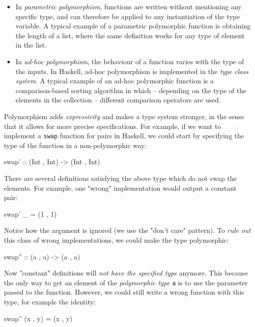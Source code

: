             \begin{itemize}
                \item In \emph{parametric polymorphism}, functions are written without mentioning any specific type,
                    and can therefore be applied to any instantiation of the type variable.
                    A typical example of a parametric polymorphic function is obtaining the length of a list,
                    where the same definition works for any type of element in the list.

                \item In \emph{ad-hoc polymorphism}, the behaviour of a function varies with the type of the inputs.
                    In Haskell, ad-hoc polymorphism is implemented in the \emph{type class system}.
                    A typical example of an ad-hoc polymorphic function is a comparison-based sorting algorithm
                    in which – depending on the type of the elements in the collection – different
                    comparison operators are used.
            \end{itemize}

            Polymorphism adds \emph{expressivity} and makes a type system stronger,
            in the sense that it allows for more precise specifications.
            For example, if we want to implement a \texttt{swap} function for pairs in Haskell,
            we could start by specifying the type of the function in a non-polymorphic way:
            \begin{haskellcode}
        swap' :: (Int , Int) -> (Int , Int)
            \end{haskellcode}

            There are several definitions satisfying the above type which do not swap the elements.
            For example, one "wrong" implementation would output a constant pair:
            \begin{haskellcode}
        swap' _ = (1 , 1)
            \end{haskellcode}

            Notice how the argument is ignored (we use the "don't care" pattern).
            To \emph{rule out} this class of wrong implementations, we could make the type polymorphic:
            \begin{haskellcode}
        swap'' :: (a , a) -> (a , a)
            \end{haskellcode}

            Now "constant" definitions will \emph{not have the specified type} anymore.
            This because the only way to get an element of the \emph{polymorphic type} \texttt{a}
            is to use the parameter passed to the function.
            However, we could still write a wrong function with this type, for example the identity:
            \begin{haskellcode}
        swap'' (x , y) = (x , y)
            \end{haskellcode}

